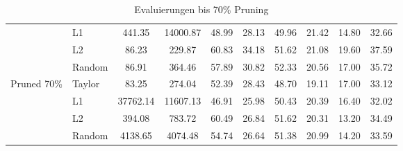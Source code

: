 \begin{table}[h]
{\begin{tabular}{l l | c c | c c c c c | r}
			                             & L1              & 441.35             & 14000.87
			                             & 48.99           & 28.13              & 49.96
			                             & 21.42           & 14.80              & 32.66            \\


			                             & L2              & 86.23              & 229.87
			                             & 60.83           & 34.18              & 51.62
			                             & 21.08           & 19.60              & 37.59            \\


			                             & Random          & 86.91              & 364.46
			                             & 57.89           & 30.82              & 52.33
			                             & 20.56           & 17.00              & 35.72            \\

			\midrule
			\multirow{4}{*}{Pruned 70\%} & Taylor          & 83.25              & 274.04
			                             & 52.39           & 28.43              & 48.70
			                             & 19.11           & 17.00              & 33.12            \\

			                             & L1              & 37762.14           & 11607.13
			                             & 46.91           & 25.98              & 50.43
			                             & 20.39           & 16.40              & 32.02            \\


			                             & L2              & 394.08             & 783.72
			                             & 60.49           & 26.84              & 51.62
			                             & 20.31           & 13.20              & 34.49            \\


			                             & Random          & 4138.65            & 4074.48
			                             & 54.74           & 26.64              & 51.38
			                             & 20.99           & 14.20              & 33.59            \\
			\bottomrule
		\end{tabular}}
	\caption{Evaluierungen bis 70\% Pruning}
	\label{tab:pruning70}
\end{table}

